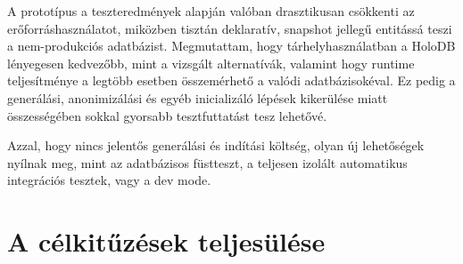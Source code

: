 \documentclass[
    parspace,
    noindent,
    nohyp,
]{elteiktdk}[2023/04/10]
\begin{document}
A prototípus a teszteredmények alapján valóban drasztikusan csökkenti az erőforráshasználatot,
miközben tisztán deklaratív, snapshot jellegű entitássá teszi a nem-produkciós adatbázist.
Megmutattam, hogy tárhelyhasználatban a HoloDB lényegesen kedvezőbb,
mint a vizsgált alternatívák,
valamint hogy runtime teljesítménye a legtöbb esetben összemérhető a valódi adatbázisokéval.
Ez pedig a generálási, anonimizálási és egyéb inicializáló lépések kikerülése miatt
összességében sokkal gyorsabb tesztfuttatást tesz lehetővé.

Azzal, hogy nincs jelentős generálási és indítási költség,
olyan új lehetőségek nyílnak meg, mint az adatbázisos füstteszt,
a teljesen izolált automatikus integrációs tesztek,
vagy a dev mode.

\section{A célkitűzések teljesülése}
\end{document}
